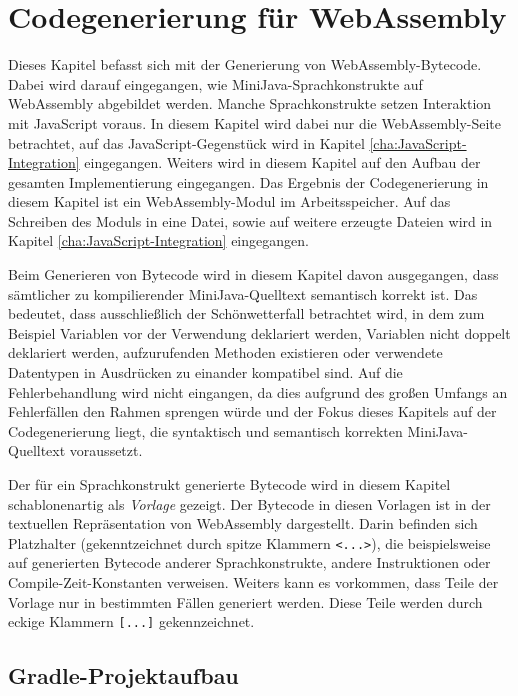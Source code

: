 \chapter{Codegenerierung für WebAssembly}

Dieses Kapitel befasst sich mit der Generierung von WebAssembly-Bytecode. Dabei wird darauf eingegangen, wie MiniJava-Sprachkonstrukte auf WebAssembly abgebildet werden. Manche Sprachkonstrukte setzen Interaktion mit JavaScript voraus. In diesem Kapitel wird dabei nur die WebAssembly-Seite betrachtet, auf das JavaScript-Gegenstück wird in Kapitel \ref{cha:JavaScript-Integration} eingegangen. Weiters wird in diesem Kapitel auf den Aufbau der gesamten Implementierung eingegangen. Das Ergebnis der Codegenerierung in diesem Kapitel ist ein WebAssembly-Modul im Arbeitsspeicher. Auf das Schreiben des Moduls in eine Datei, sowie auf weitere erzeugte Dateien wird in Kapitel \ref{cha:JavaScript-Integration} eingegangen.

Beim Generieren von Bytecode wird in diesem Kapitel davon ausgegangen, dass sämtlicher zu kompilierender MiniJava-Quelltext semantisch korrekt ist. Das bedeutet, dass ausschließlich der Schönwetterfall betrachtet wird, in dem zum Beispiel Variablen vor der Verwendung deklariert werden, Variablen nicht doppelt deklariert werden, aufzurufenden Methoden existieren oder verwendete Datentypen in Ausdrücken zu einander kompatibel sind. Auf die Fehlerbehandlung wird nicht eingangen, da dies aufgrund des großen Umfangs an Fehlerfällen den Rahmen sprengen würde und der Fokus dieses Kapitels auf der Codegenerierung liegt, die syntaktisch und semantisch korrekten MiniJava-Quelltext voraussetzt.

Der für ein Sprachkonstrukt generierte Bytecode wird in diesem Kapitel schablonenartig als \emph{Vorlage} gezeigt. Der Bytecode in diesen Vorlagen ist in der textuellen Repräsentation von WebAssembly dargestellt. Darin befinden sich Platzhalter (gekenntzeichnet durch spitze Klammern \lstinline{<...>}), die beispielsweise auf generierten Bytecode anderer Sprachkonstrukte, andere Instruktionen oder Compile-Zeit-Konstanten verweisen. Weiters kann es vorkommen, dass Teile der Vorlage nur in bestimmten Fällen generiert werden. Diese Teile werden durch eckige Klammern \lstinline{[...]} gekennzeichnet.

\section{Gradle-Projektaufbau}

